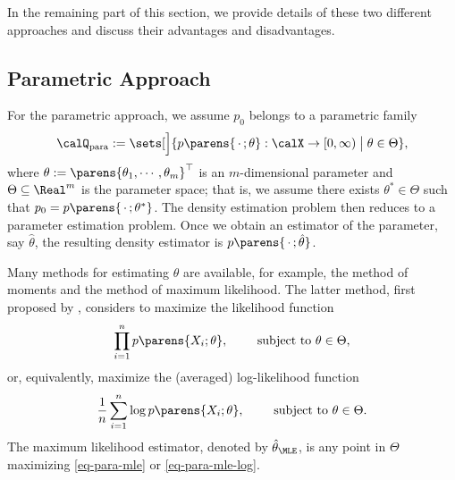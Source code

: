 \documentclass[12pt]{article}
\theoremstyle{definition}
\theoremstyle{theorem}
\theoremstyle{remark}
\begin{document}
In the remaining part of this section, we provide details of these two different approaches and discuss their advantages and disadvantages. 

\subsection{Parametric Approach}\label{subsection-parametric-density-estimation}

For the parametric approach, we assume $p_0$ belongs to a parametric family 
\begin{align}\label{eq-para-model}
	\calQ_{\mathrm{para}} := \sets[\Big]{p \parens{\,\cdot\,; \theta}: \calX \to [0, \infty) \bigm| \theta \in \Theta}, 
\end{align}
where $\theta := \parens{\theta_1, \cdots, \theta_m}^\top$ is an $m$-dimensional parameter and $\Theta \subseteq \Real^m$ is the parameter space; that is, we assume there exists $\theta^* \in \Theta$ such that $p_0 = p \parens{\,\cdot\,; \theta^*}$. The density estimation problem then reduces to a parameter estimation problem. Once we obtain an estimator of the parameter, say $\hat{\theta}$, the resulting density estimator is $p \parens{\,\cdot\,; \hat{\theta}}$. 

Many methods for estimating $\theta$ are available, for example, the method of moments and the method of maximum likelihood. 
The latter method, first proposed by \textcites{Fisher1922-qi}, considers to maximize the likelihood function
\begin{align}\label{eq-para-mle}
	\prod_{i=1}^n p \parens{X_i; \theta}, \qquad \text{ subject to } \theta \in \Theta, 
\end{align}
or, equivalently, maximize the (averaged) log-likelihood function
\begin{align}\label{eq-para-mle-log}
	\frac{1}{n} \sum_{i=1}^n \log p \parens{X_i; \theta}, \qquad \text{ subject to } \theta \in \Theta. 
\end{align}
The maximum likelihood estimator, denoted by $\hat{\theta}_{\MLE}$, is any point in $\Theta$ maximizing \eqref{eq-para-mle} or \eqref{eq-para-mle-log}. 
\end{document}
